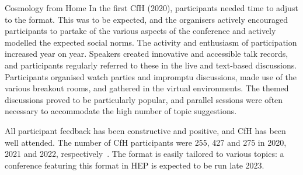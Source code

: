 \documentclass[../SustainableHEP.tex]{subfiles}
\begin{document}
\begin{casestudy}{Cosmology from Home}
In the first CfH (2020), participants needed time to adjust to the format. This was to be expected, and the organisers actively encouraged participants to partake of the various aspects of the conference and actively modelled the expected social norms. The activity and enthusiasm of participation increased year on year. Speakers created innovative and accessible talk records, and participants regularly referred to these in the live and text-based discussions. Participants organised watch parties and impromptu discussions, made use of the various breakout rooms, and gathered in the virtual environments. The themed discussions proved to be particularly popular, and parallel sessions were often necessary to accommodate the high number of topic suggestions.


All participant feedback has been constructive and positive, and CfH has been well attended. The number of CfH participants were 255, 427 and 275 in 2020, 2021 and 2022, respectively~\cite{CfHwebsite}.  The format is easily tailored to various topics: a conference featuring this format in HEP is expected to be run late 2023.




\end{casestudy}
\end{document}
